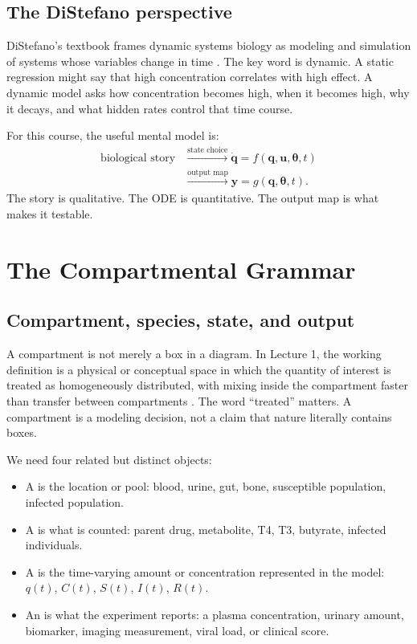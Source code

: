 \documentclass[a4paper]{article}
\newcommand{\vect}[1]{\boldsymbol{#1}}
\begin{document}
\subsection{The DiStefano perspective}

DiStefano's textbook frames dynamic systems biology as modeling and simulation of systems whose variables change in time \cite{distefano2015DynamicSystemsBiology}. The key word is dynamic. A static regression might say that high concentration correlates with high effect. A dynamic model asks how concentration becomes high, when it becomes high, why it decays, and what hidden rates control that time course.

For this course, the useful mental model is:
\[
  \begin{aligned}
  \boxed{\text{biological story}}
  &\stackrel{\text{state choice}}{\longrightarrow}
  \boxed{\dot{\vect q}=f(\vect q,\vect u,\vect\theta,t)}\\
  &\stackrel{\text{output map}}{\longrightarrow}
  \boxed{\vect y=g(\vect q,\vect\theta,t)}.
  \end{aligned}
\]
The story is qualitative. The ODE is quantitative. The output map is what makes it testable.

\section{The Compartmental Grammar}

\subsection{Compartment, species, state, and output}

A compartment is not merely a box in a diagram. In Lecture 1, the working definition is a physical or conceptual space in which the quantity of interest is treated as homogeneously distributed, with mixing inside the compartment faster than transfer between compartments \cite{bmeg671Lecture1Slides2025,bmeg671TranscriptAug272025}. The word ``treated'' matters. A compartment is a modeling decision, not a claim that nature literally contains boxes.

We need four related but distinct objects:
\begin{itemize}[leftmargin=2em]
  \item A  is the location or pool: blood, urine, gut, bone, susceptible population, infected population.
  \item A  is what is counted: parent drug, metabolite, T4, T3, butyrate, infected individuals.
  \item A  is the time-varying amount or concentration represented in the model: \(q(t)\), \(C(t)\), \(S(t)\), \(I(t)\), \(R(t)\).
  \item An  is what the experiment reports: a plasma concentration, urinary amount, biomarker, imaging measurement, viral load, or clinical score.
\end{itemize}
\end{document}
